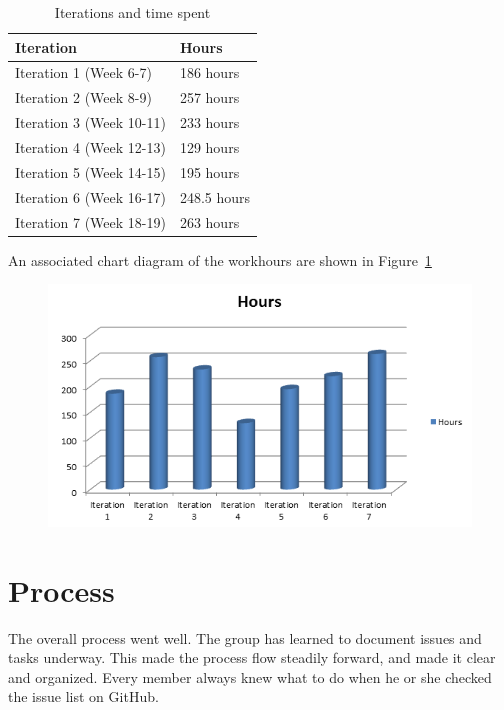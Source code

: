 	\begin{table}[H]
	\caption{Iterations and time spent}
	\centering
	\label{table:workhours}
	\begin{tabular}{|l|l|}
		\hline
			{\bf Iteration} & {\bf Hours}\\
		\hline
			Iteration 1 (Week 6-7) & 186 hours\\
		\hline
			Iteration 2 (Week 8-9) & 257 hours\\
		\hline
			Iteration 3 (Week 10-11) & 233 hours\\
		\hline
			Iteration 4 (Week 12-13) & 129 hours\\
		\hline
			Iteration 5 (Week 14-15) & 195 hours\\
		\hline
			Iteration 6 (Week 16-17) & 248.5 hours\\
		\hline
			Iteration 7 (Week 18-19) & 263 hours\\
		\hline
	\end{tabular}
	\end{table}

	An associated chart diagram of the workhours are shown in Figure~\ref{fig:workhours}

	\begin{figure}[H]
	\centering
	\label{fig:workhours}
	\includegraphics[scale=0.8]{images/workhours_chart2.png}
	\end{figure}



	\section{Process}
	The overall process went well. The group has learned to document issues and tasks underway. This made the process flow steadily forward, and made it clear and organized. Every member always knew what to do when he or she checked the issue list on GitHub.

